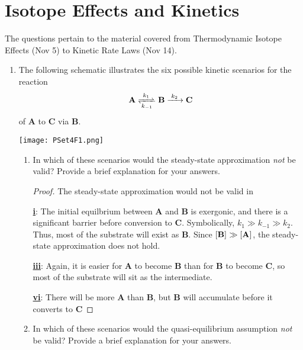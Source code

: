 \documentclass[../psets.tex]{subfiles}
\begin{document}
\section{Isotope Effects and Kinetics}
The questions pertain to the material covered from Thermodynamic Isotope Effects (Nov 5) to Kinetic Rate Laws (Nov 14).
\begin{enumerate}
    \item The following schematic illustrates the six possible kinetic scenarios for the reaction
    \begin{equation*}
        \ce{\textbf{A} <=>[$k_1$][$k_{-1}$] \textbf{B} ->[$k_2$] \textbf{C}}
    \end{equation*}
    of \textbf{A} to \textbf{C} via \textbf{B}.
    \begin{center}
        \texttt{[image: PSet4F1.png]}
    \end{center}
    \begin{enumerate}
        \item In which of these scenarios would the steady-state approximation \emph{not} be valid? Provide a brief explanation for your answers.
        \begin{proof}
            The steady-state approximation would not be valid in \par
            \underline{\textbf{i}}: The initial equilbrium between \textbf{A} and \textbf{B} is exergonic, and there is a significant barrier before conversion to \textbf{C}. Symbolically, $k_1\gg k_{-1}\gg k_2$. Thus, most of the substrate will exist as \textbf{B}. Since $\cnc{\textbf{B}}\gg\cnc{\textbf{A}}$, the steady-state approximation does not hold.\par
            \underline{\textbf{iii}}: Again, it is easier for \textbf{A} to become \textbf{B} than for \textbf{B} to become \textbf{C}, so most of the substrate will sit as the intermediate.\par
            \underline{\textbf{vi}}: There will be more \textbf{A} than \textbf{B}, but \textbf{B} will accumulate before it converts to \textbf{C}
        \end{proof}
        \item In which of these scenarios would the quasi-equilibrium assumption \emph{not} be valid? Provide a brief explanation for your answers.

\end{enumerate}
\end{enumerate}
\end{document}
